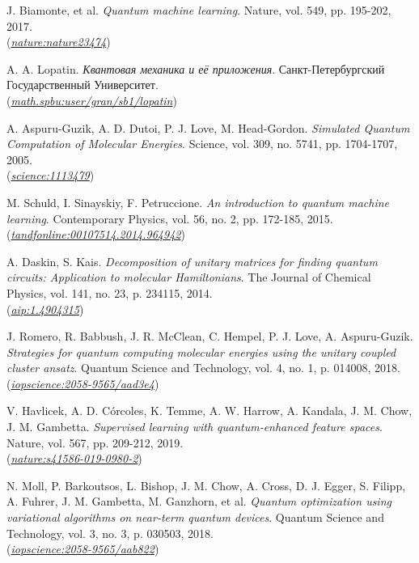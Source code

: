 \documentclass[a4paper]{report}
\begin{document}
\begin{thebibliography}{99}
    J. Biamonte, et al. \textit{Quantum machine learning}. Nature, vol. 549, pp. 195-202, 2017.\\
    (\href{https://www.nature.com/articles/nature23474}{\textit{nature:nature23474}})

    A. A. Lopatin. \textit{Квантовая механика и её приложения}. Санкт-Петербургский Государственный Университет.\\
    (\href{https://math.spbu.ru/user/gran/sb1/lopatin.pdf}{\textit{math.spbu:user/gran/sb1/lopatin}})

    A. Aspuru-Guzik, A. D. Dutoi, P. J. Love, M. Head-Gordon. \textit{Simulated Quantum Computation of Molecular Energies}. Science, vol. 309, no. 5741, pp. 1704-1707, 2005.\\
    (\href{https://www.science.org/doi/10.1126/science.1113479}{\textit{science:1113479}})

    M. Schuld, I. Sinayskiy, F. Petruccione. \textit{An introduction to quantum machine learning}. Contemporary Physics, vol. 56, no. 2, pp. 172-185, 2015.\\
    (\href{https://www.tandfonline.com/doi/abs/10.1080/00107514.2014.964942}{\textit{tandfonline:00107514.2014.964942}})

    A. Daskin, S. Kais. \textit{Decomposition of unitary matrices for finding quantum circuits: Application to molecular Hamiltonians}. The Journal of Chemical Physics, vol. 141, no. 23, p. 234115, 2014.\\
    (\href{https://aip.scitation.org/doi/10.1063/1.4904315}{\textit{aip:1.4904315}})

    J. Romero, R. Babbush, J. R. McClean, C. Hempel, P. J. Love, A. Aspuru-Guzik. \textit{Strategies for quantum computing molecular energies using the unitary coupled cluster ansatz}. Quantum Science and Technology, vol. 4, no. 1, p. 014008, 2018.\\
    (\href{https://iopscience.iop.org/article/10.1088/2058-9565/aad3e4}{\textit{iopscience:2058-9565/aad3e4}})

    V. Havlicek, A. D. Córcoles, K. Temme, A. W. Harrow, A. Kandala, J. M. Chow, J. M. Gambetta. \textit{Supervised learning with quantum-enhanced feature spaces}. Nature, vol. 567, pp. 209-212, 2019.\\
    (\href{https://www.nature.com/articles/s41586-019-0980-2}{\textit{nature:s41586-019-0980-2}})

    N. Moll, P. Barkoutsos, L. Bishop, J. M. Chow, A. Cross, D. J. Egger, S. Filipp, A. Fuhrer, J. M. Gambetta, M. Ganzhorn, et al. \textit{Quantum optimization using variational algorithms on near-term quantum devices}. Quantum Science and Technology, vol. 3, no. 3, p. 030503, 2018.\\
    (\href{https://iopscience.iop.org/article/10.1088/2058-9565/aab822}{\textit{iopscience:2058-9565/aab822}})
\end{thebibliography}
\end{document}
